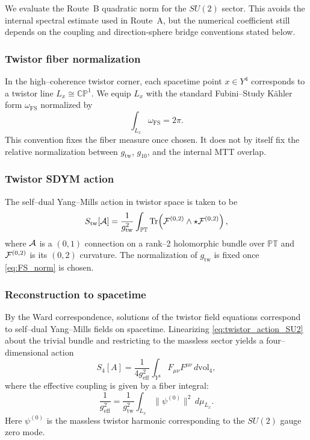 \documentclass[11pt]{article}
\begin{document}
We evaluate the Route~B quadratic norm for the $SU(2)$ sector. This avoids the
internal spectral estimate used in Route~A, but the numerical coefficient still
depends on the coupling and direction-sphere bridge conventions stated below.

\subsubsection{Twistor fiber normalization}

In the high--coherence twistor corner, each spacetime point $x\in Y^4$
corresponds to a twistor line $L_x\cong\mathbb{CP}^1$.
We equip $L_x$ with the standard Fubini--Study K\"ahler form
$\omega_{\mathrm{FS}}$ normalized by
\begin{equation}
\int_{L_x}\omega_{\mathrm{FS}} = 2\pi.
\label{eq:FS_norm}
\end{equation}
This convention fixes the fiber measure once chosen. It does not by itself
fix the relative normalization between $g_{\mathrm{tw}}$, $g_{10}$, and the
internal MTT overlap.

\subsubsection{Twistor SDYM action}

The self--dual Yang--Mills action in twistor space is taken to be
\begin{equation}
S_{\mathrm{tw}}[{\cal A}]
=
\frac{1}{g_{\mathrm{tw}}^2}
\int_{\mathbb{PT}}
\mathrm{Tr}\!\left(
{\cal F}^{(0,2)}\wedge \star {\cal F}^{(0,2)}
\right),
\label{eq:twistor_action_SU2}
\end{equation}
where ${\cal A}$ is a $(0,1)$ connection on a rank--2 holomorphic bundle over
$\mathbb{PT}$ and ${\cal F}^{(0,2)}$ is its $(0,2)$ curvature.
The normalization of $g_{\mathrm{tw}}$ is fixed once \eqref{eq:FS_norm} is chosen.

\subsubsection{Reconstruction to spacetime}

By the Ward correspondence, solutions of the twistor field equations correspond
to self--dual Yang--Mills fields on spacetime.
Linearizing \eqref{eq:twistor_action_SU2} about the trivial bundle and
restricting to the massless sector yields a four--dimensional action
\begin{equation}
S_{4}[A]
=
\frac{1}{4g_{\mathrm{eff}}^2}
\int_{Y^4} F_{\mu\nu}F^{\mu\nu}\,d\mathrm{vol}_4,
\label{eq:4d_SU2}
\end{equation}
where the effective coupling is given by a fiber integral:
\begin{equation}
\frac{1}{g_{\mathrm{eff}}^2}
=
\frac{1}{g_{\mathrm{tw}}^2}
\int_{L_x}
\|\psi^{(0)}\|^2\,d\mu_{L_x}.
\label{eq:SU2_fiber_norm}
\end{equation}
Here $\psi^{(0)}$ is the massless twistor harmonic corresponding to the
$SU(2)$ gauge zero mode.
\end{document}
